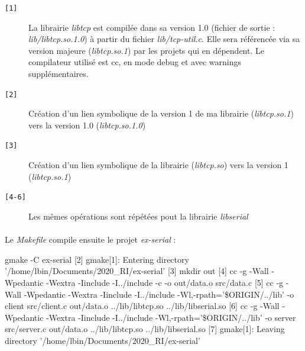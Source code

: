 \documentclass{article}
\begin{document}
    \begin{description}
        \item[\texttt{[1]} ] La librairie \emph{libtcp} est compilée dans sa version 1.0 (fichier de sortie : \emph{lib/libtcp.so.1.0}) à partir du fichier \emph{lib/tcp-util.c}. Elle sera référencée via sa version majeure (\emph{libtcp.so.1}) par les projets qui en dépendent. Le compilateur utilisé est cc, en mode debug et avec warnings supplémentaires.
        \item[\texttt{[2]} ] Création d'un lien symbolique de la version 1 de ma librairie (\emph{libtcp.so.1}) vers la version 1.0 (\emph{libtcp.so.1.0})
        \item[\texttt{[3]} ] Création d'un lien symbolique de la librairie (\emph{libtcp.so}) vers la version 1 (\emph{libtcp.so.1})
        \item[\texttt{[4-6]} ] Les mêmes opérations sont répétées pout la librairie \emph{libserial}
    \end{description}

    \paragraph{}
    Le \emph{Makefile} compile ensuite le projet \emph{ex-serial} :
    \begin{verbatimtab}
[1]         gmake -C ex-serial
[2]         gmake[1]: Entering directory '/home/lbin/Documents/2020_RI/ex-serial'
[3]         mkdir out
[4]         cc -g  -Wall -Wpedantic -Wextra -Iinclude -I../include
                -c -o out/data.o src/data.c
[5]         cc -g  -Wall -Wpedantic -Wextra -Iinclude -I../include 
                -Wl,-rpath='\$ORIGIN/../lib' -o client src/client.c
                out/data.o ../lib/libtcp.so ../lib/libserial.so
[6]         cc -g  -Wall -Wpedantic -Wextra -Iinclude -I../include
                -Wl,-rpath='\$ORIGIN/../lib' -o server src/server.c
                out/data.o ../lib/libtcp.so ../lib/libserial.so
[7]         gmake[1]: Leaving directory '/home/lbin/Documents/2020_RI/ex-serial'
    \end{verbatimtab}
\end{document}
